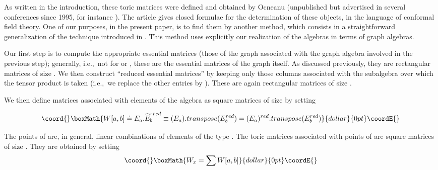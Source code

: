 \documentclass[a4paper,11pt]{article}
\def\ie{{\rm i.e.,\/}\ }
\def \otimesdot {\stackrel{\cdot}{\otimes}}
\begin{document}
As written in the introduction, these toric matrices
were defined and obtained by Ocneanu (unpublished but advertised in
several conferences since 1995, for instance \cite{Ocneanu:Marseille}).
The article \cite{PetZub:Oc} gives closed formulae for the
determination of these objects, in the language of conformal field theory.
One of our purposes, in the present paper,
is to find them by another method, which consists in
a straightforward generalization of
the technique introduced in \cite{Coque:qtetra}. This method uses
explicitly our realization of the algebras \coordHE{} in
terms of graph algebras.

Our first step is to compute the appropriate essential matrices
(those of the graph
associated with the graph algebra
involved in the previous step); generally, \ie not for \coordHE{} or
\coordHE{}, these are
the \coordHE{} essential
matrices of the graph \coordHE{} itself.  As discussed previously, they are
rectangular matrices \coordHE{} of size
\coordHE{}.
We then construct ``reduced essential matrices'' \coordHE{} by
keeping only those columns associated
with the subalgebra over which the tensor product is taken (\ie we
replace the other entries by \coordHE{}). These are again
rectangular matrices of
size \coordHE{}.

We then define matrices \coordHE{} associated with elements \coordHE{}
of the algebra \coordHE{} as square
matrices of size \coordHE{} by setting

$$\coord{}\boxMath{
W[a,b] \doteq E_a . \widetilde{E_b}^{red} \equiv (E_a).
transpose(E_b^{red}) =
(E_a)^{red}. transpose(E_b^{red})
}{dollar}{0pt}\coordE{}$$

The points \coordHE{} of \coordHE{} are, in general, linear combinations of
elements of the type \myHighlight{$a \otimesdot b$}\coordHE{}.
The toric matrices  \coordHE{} associated with points \myHighlight{$x = \sum a \otimesdot b$}\coordHE{}
of \coordHE{} are square matrices of size \coordHE{}.
They are  obtained  by setting $$\coord{}\boxMath{ W_{x}= \sum W[a,b] }{dollar}{0pt}\coordE{}$$
\end{document}
